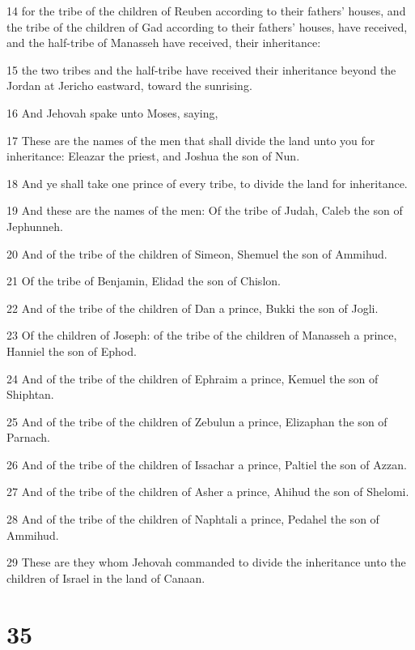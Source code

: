 \par 14 for the tribe of the children of Reuben according to their fathers' houses, and the tribe of the children of Gad according to their fathers' houses, have received, and the half-tribe of Manasseh have received, their inheritance:
\par 15 the two tribes and the half-tribe have received their inheritance beyond the Jordan at Jericho eastward, toward the sunrising.
\par 16 And Jehovah spake unto Moses, saying,
\par 17 These are the names of the men that shall divide the land unto you for inheritance: Eleazar the priest, and Joshua the son of Nun.
\par 18 And ye shall take one prince of every tribe, to divide the land for inheritance.
\par 19 And these are the names of the men: Of the tribe of Judah, Caleb the son of Jephunneh.
\par 20 And of the tribe of the children of Simeon, Shemuel the son of Ammihud.
\par 21 Of the tribe of Benjamin, Elidad the son of Chislon.
\par 22 And of the tribe of the children of Dan a prince, Bukki the son of Jogli.
\par 23 Of the children of Joseph: of the tribe of the children of Manasseh a prince, Hanniel the son of Ephod.
\par 24 And of the tribe of the children of Ephraim a prince, Kemuel the son of Shiphtan.
\par 25 And of the tribe of the children of Zebulun a prince, Elizaphan the son of Parnach.
\par 26 And of the tribe of the children of Issachar a prince, Paltiel the son of Azzan.
\par 27 And of the tribe of the children of Asher a prince, Ahihud the son of Shelomi.
\par 28 And of the tribe of the children of Naphtali a prince, Pedahel the son of Ammihud.
\par 29 These are they whom Jehovah commanded to divide the inheritance unto the children of Israel in the land of Canaan.

\chapter{35}

